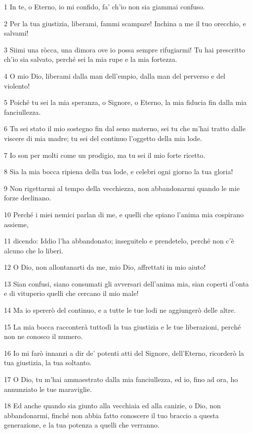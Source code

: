\par 1 In te, o Eterno, io mi confido, fa' ch'io non sia giammai confuso.
\par 2 Per la tua giustizia, liberami, fammi scampare! Inchina a me il tuo orecchio, e salvami!
\par 3 Siimi una ròcca, una dimora ove io possa sempre rifugiarmi! Tu hai prescritto ch'io sia salvato, perché sei la mia rupe e la mia fortezza.
\par 4 O mio Dio, liberami dalla man dell'empio, dalla man del perverso e del violento!
\par 5 Poiché tu sei la mia speranza, o Signore, o Eterno, la mia fiducia fin dalla mia fanciullezza.
\par 6 Tu sei stato il mio sostegno fin dal seno materno, sei tu che m'hai tratto dalle viscere di mia madre; tu sei del continuo l'oggetto della mia lode.
\par 7 Io son per molti come un prodigio, ma tu sei il mio forte ricetto.
\par 8 Sia la mia bocca ripiena della tua lode, e celebri ogni giorno la tua gloria!
\par 9 Non rigettarmi al tempo della vecchiezza, non abbandonarmi quando le mie forze declinano.
\par 10 Perché i miei nemici parlan di me, e quelli che spiano l'anima mia cospirano assieme,
\par 11 dicendo: Iddio l'ha abbandonato; inseguitelo e prendetelo, perché non c'è alcuno che lo liberi.
\par 12 O Dio, non allontanarti da me, mio Dio, affrettati in mio aiuto!
\par 13 Sian confusi, siano consumati gli avversari dell'anima mia, sian coperti d'onta e di vituperio quelli che cercano il mio male!
\par 14 Ma io spererò del continuo, e a tutte le tue lodi ne aggiungerò delle altre.
\par 15 La mia bocca racconterà tuttodì la tua giustizia e le tue liberazioni, perché non ne conosco il numero.
\par 16 Io mi farò innanzi a dir de' potenti atti del Signore, dell'Eterno, ricorderò la tua giustizia, la tua soltanto.
\par 17 O Dio, tu m'hai ammaestrato dalla mia fanciullezza, ed io, fino ad ora, ho annunziato le tue maraviglie.
\par 18 Ed anche quando sia giunto alla vecchiaia ed alla canizie, o Dio, non abbandonarmi, finché non abbia fatto conoscere il tuo braccio a questa generazione, e la tua potenza a quelli che verranno.

